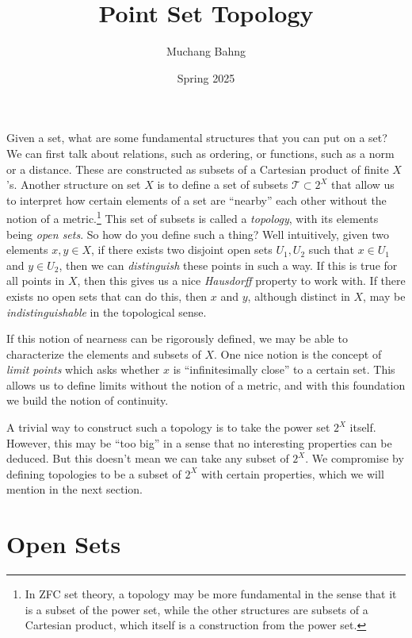\documentclass{article}
\begin{document}
\title{Point Set Topology}
\author{Muchang Bahng}
\date{Spring 2025}

\maketitle
\tableofcontents
\pagebreak

  Given a set, what are some fundamental structures that you can put on a set? We can first talk about relations, such as ordering, or functions, such as a norm or a distance. These are constructed as subsets of a Cartesian product of finite $X$'s. Another structure on set $X$ is to define a set of subsets $\mathscr{T} \subset 2^X$ that allow us to interpret how certain elements of a set are ``nearby'' each other without the notion of a metric.\footnote{In ZFC set theory, a topology may be more fundamental in the sense that it is a subset of the power set, while the other structures are subsets of a Cartesian product, which itself is a construction from the power set.} This set of subsets is called a \textit{topology}, with its elements being \textit{open sets}. So how do you define such a thing? Well intuitively, given two elements $x, y \in X$, if there exists two disjoint open sets $U_1, U_2$ such that $x \in U_1$ and $y \in U_2$, then we can \textit{distinguish} these points in such a way. If this is true for all points in $X$, then this gives us a nice \textit{Hausdorff} property to work with. If there exists no open sets that can do this, then $x$ and $y$, although distinct in $X$, may be \textit{indistinguishable} in the topological sense. 
  
  If this notion of nearness can be rigorously defined, we may be able to characterize the elements and subsets of $X$. One nice notion is the concept of \textit{limit points} which asks whether $x$ is ``infinitesimally close'' to a certain set. This allows us to define limits without the notion of a metric, and with this foundation we build the notion of continuity.    

  A trivial way to construct such a topology is to take the power set $2^X$ itself. However, this may be ``too big'' in a sense that no interesting properties can be deduced. But this doesn't mean we can take any subset of $2^X$. We compromise by defining topologies to be a subset of $2^X$ with certain properties, which we will mention in the next section. 

\section{Open Sets} 
\end{document}
